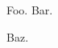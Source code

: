 \documentclass{article}
\begin{document}
	Foo.\autocite{BurleyDPAL}
	Bar.\autocite{Green-Pedersen1980b}
	
	Baz.\autocite{BurleyDPAL}
	
	\printshorthands
	\printbibliography
\end{document}
